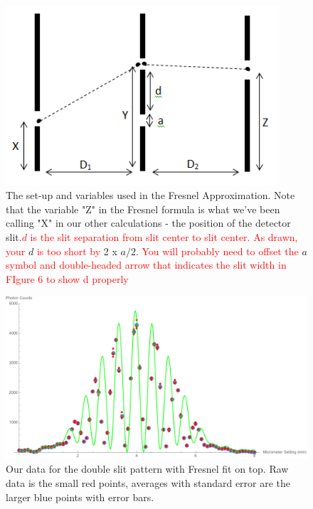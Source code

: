 \documentclass[prb,preprint]{revtex4-1}
\begin{document}
{\begin{figure}[h!]
\centering
\includegraphics[width=4in]{Fresnel_diagram.png}
\caption{The set-up and variables used in the Fresnel Approximation. Note that the variable "Z" in the Fresnel formula is what we've been calling "X" in our other calculations - the position of the detector slit.\textcolor{red}{$d$ is the slit separation from slit center to slit center. As drawn, your }$d$ \textcolor{red}{is too short by} 2 x $a/2$. \textcolor{red}{You will probably need to offset the} $a$ \textcolor{red}{symbol and double-headed arrow that indicates the slit width in FIgure 6 to show d properly}}
\label{Fresnel_diagram}
\end{figure}

\begin{figure}[h!]
\centering
\includegraphics[width=6in]{double_slit_Fresnel_plot.pdf}
\caption{Our data for the double slit pattern with Fresnel fit on top.  Raw data is the small red points, averages with standard error are the larger blue points with error bars. }
\label{double_slit_Fresnel_plot}
\end{figure}

}
\end{document}
